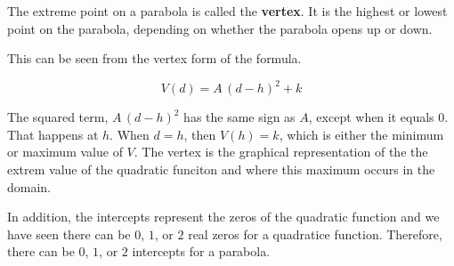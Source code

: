 \documentclass{ximera}
\begin{document}
\begin{image}
\end{image}










The extreme point on a parabola is called the \textbf{vertex}.  It is the highest or lowest point on the parabola, depending on whether the parabola opens up or down. 

This can be seen from the vertex form of the formula.




\[
V(d) = A \, (d - h)^2 + k
\]

The squared term, $A \, (d - h)^2$ has the same sign as $A$, except when it equals $0$.  That happens at $h$.  When $d = h$, then $V(h) = k$, which is either the minimum or maximum value of $V$.  The vertex is the graphical representation of the the extrem value of the quadratic funciton and where this maximum occurs in the domain.


In addition, the intercepts represent the zeros of the quadratic function and we have seen there can be $0$, $1$, or $2$ real zeros for a quadratice function.  Therefore, there can be $0$, $1$, or $2$ intercepts for a parabola.
\end{document}
